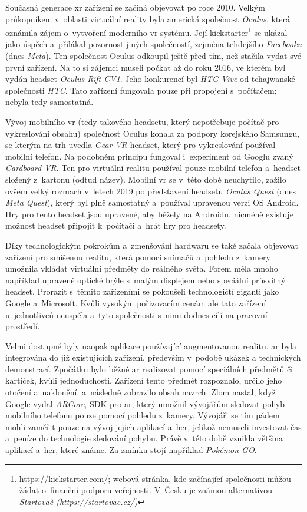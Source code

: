 Současná generace \gls{xr} zařízení se začíná objevovat po roce 2010. Velkým průkopníkem v~oblasti virtuální reality byla americká společnost \textit{Oculus}, která oznámila zájem o~vytvoření moderního \gls{vr} systému. Její kickstarter\footnote{\url{https://kickstarter.com/}; webová stránka, kde začínající společnosti můžou žádat o~finanční podporu veřejnosti. V~Česku je známou alternativou \em Startovač (\url{https://startovac.cz/})} se ukázal jako úspěch a~přilákal pozornost jiných společností, zejména tehdejšího \textit{Facebooku} (dnes \textit{Meta}). Ten společnost Oculus odkoupil ještě před tím, než stačila vydat své první zařízení. Na to si zájemci museli počkat až do roku 2016, ve kterém byl vydán headset \textit{Oculus Rift CV1}. Jeho konkurencí byl \textit{HTC Vive} od tchajwanské společnosti \textit{HTC}. Tato zařízení fungovala pouze při propojení s~počítačem; nebyla tedy samostatná. \cite{otechnice_3}

Vývoj mobilního \gls{vr} (tedy takového headsetu, který nepotřebuje počítač pro vykreslování obsahu) společnost Oculus konala za podpory korejského Samsungu, se kterým na trh uvedla \textit{Gear VR} \poml headset, který pro vykreslování používal mobilní telefon. Na podobném principu fungoval i~experiment od Googlu zvaný \textit{Cardboard VR}. Ten pro virtuální realitu používal pouze mobilní telefon a~headset složený z~kartonu (odtud název). Mobilní \gls{vr} se v~této době neuchytilo, zažilo ovšem velký rozmach v~letech 2019 po představení headsetu \textit{Oculus Quest} (dnes \textit{Meta Quest}), který byl plně samostatný a~používal upravenou verzi OS Android. Hry pro tento headset jsou upravené, aby běžely na Androidu, nicméně existuje možnost headset připojit k~počítači a~hrát hry pro  headsety. \cite{otechnice_3}

Díky technologickým pokrokům a~zmenšování hardwaru se také začala objevovat zařízení pro smíšenou realitu, která pomocí snímačů a~pohledu z~kamery umožnila vkládat virtuální předměty do reálného světa. Forem měla mno\-ho \poml například upravené optické brýle s~malým displejem nebo speciální průsvitný headset. Prorazit s~těmito zařízeními se pokoušeli technologičtí giganti jako Google a~Microsoft. Kvůli vysokým pořizovacím cenám ale tato zařízení u~jednotlivců neuspěla a~tyto společnosti s~nimi dodnes cílí na pracovní prostředí. \cite{google_glass_mobilenet}

Velmi dostupné byly naopak aplikace používající augmentovanou realitu. \gls{ar} byla integrována do již existujících zařízení, především v~podobě ukázek a technických demonstrací. Zpočátku bylo běžné \gls{ar} realizovat pomocí speciálních předmětů či kartiček, kvůli jednoduchosti. Zařízení tento předmět rozpoznalo, určilo jeho otočení a~naklonění, a~následně zobrazilo obsah navrch. Zlom nastal, když Google vydal \textit{ARCore}, \gls{SDK} pro \gls{ar}, který umožnil vývojářům sledovat pohyb mobilního telefonu pouze pomocí pohledu z~kamery. Vývojáři se tím pádem mohli zaměřit pouze na vývoj jejich aplikací a~her, jelikož nemuseli investovat čas a~peníze do technologie sledování pohybu. Právě v~této době vznikla většina aplikací a~her, které známe. Za zmínku stojí například \textit{Pokémon GO}. \cite{enwiki:1182789097}

